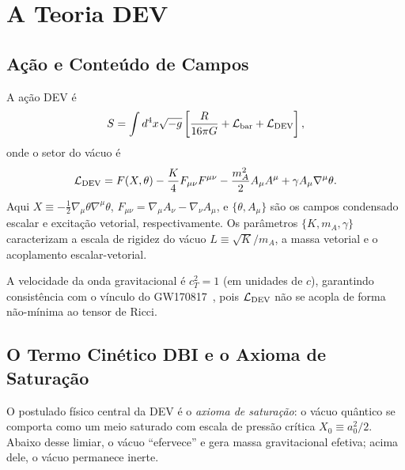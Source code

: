 \documentclass[aps,prd,twocolumn,showpacs,superscriptaddress]{revtex4-2}
\newcommand{\Lbar}{\mathcal{L}}
\newcommand{\aO}{a_0}
\newcommand{\Xzero}{X_0}
\begin{document}
\section{A Teoria DEV}
\label{sec:theory}

\subsection{Ação e Conteúdo de Campos}

A ação DEV é
\begin{equation}
  S = \int d^4x\sqrt{-g}\left[
    \frac{R}{16\pi G}
    + \Lbar_{\rm bar}
    + \Lbar_{\rm DEV}
  \right],
  \label{eq:action}
\end{equation}
onde o setor do vácuo é
\begin{equation}
  \Lbar_{\rm DEV} = F(X,\theta)
    - \frac{K}{4}F_{\mu\nu}F^{\mu\nu}
    - \frac{m_A^2}{2}A_\mu A^\mu
    + \gamma A_\mu\nabla^\mu\theta.
  \label{eq:LDEV}
\end{equation}
Aqui $X \equiv -\frac{1}{2}\nabla_\mu\theta\nabla^\mu\theta$,
$F_{\mu\nu} = \nabla_\mu A_\nu - \nabla_\nu A_\mu$, e
$\{\theta, A_\mu\}$ são os campos condensado escalar e excitação
vetorial, respectivamente.
Os parâmetros $\{K, m_A, \gamma\}$ caracterizam a escala de
rigidez do vácuo $L \equiv \sqrt{K}/m_A$, a massa vetorial e
o acoplamento escalar-vetorial.

A velocidade da onda gravitacional é $c_T^2 = 1$ (em unidades
de $c$), garantindo consistência com o vínculo do
GW170817~\cite{GW170817}, pois $\Lbar_{\rm DEV}$ não se acopla
de forma não-mínima ao tensor de Ricci.

\subsection{O Termo Cinético DBI e o Axioma de Saturação}

O postulado físico central da DEV é o \emph{axioma de saturação}:
o vácuo quântico se comporta como um meio saturado com escala de
pressão crítica $\Xzero \equiv \aO^2/2$.
Abaixo desse limiar, o vácuo ``efervece'' e gera massa gravitacional
efetiva; acima dele, o vácuo permanece inerte.
\end{document}
